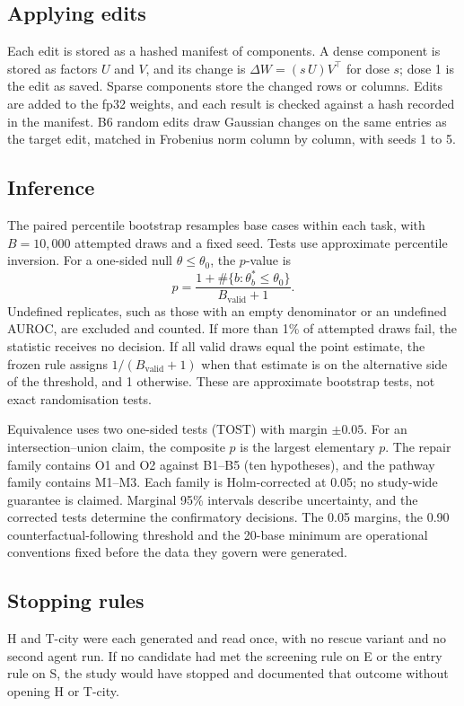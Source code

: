 \subsection{Applying edits}

Each edit is stored as a hashed manifest of components. A dense component is stored as factors $U$ and $V$, and its
change is $\Delta W = (s\,U) V^{\top}$ for dose $s$; dose 1 is the edit as saved. Sparse components store the changed
rows or columns. Edits are added to the fp32 weights, and each result is checked against a hash recorded in the
manifest. B6 random edits draw Gaussian changes on the same entries as the target edit, matched in Frobenius norm
column by column, with seeds 1 to 5.

\subsection{Inference}

The paired percentile bootstrap resamples base cases within each task, with $B = 10{,}000$ attempted draws and a
fixed seed. Tests use approximate percentile inversion. For a one-sided null $\theta \leq \theta_0$, the $p$-value is
\[
  p = \frac{1 + \#\{b : \theta_b^* \leq \theta_0\}}{B_{\mathrm{valid}} + 1}.
\]
Undefined replicates, such as those with an empty denominator or an undefined AUROC, are excluded and counted. If more
than 1\% of attempted draws fail, the statistic receives no decision. If all valid draws equal the point estimate, the
frozen rule assigns $1/(B_{\mathrm{valid}}+1)$ when that estimate is on the alternative side of the threshold, and 1
otherwise. These are approximate bootstrap tests, not exact randomisation tests.

Equivalence uses two one-sided tests (TOST) with margin $\pm 0.05$. For an intersection--union claim, the composite
$p$ is the largest elementary $p$. The repair family contains O1 and O2 against B1--B5 (ten hypotheses), and the
pathway family contains M1--M3. Each family is Holm-corrected at 0.05; no study-wide guarantee is claimed. Marginal
95\% intervals describe uncertainty, and the corrected tests determine the confirmatory decisions. The 0.05 margins,
the 0.90 counterfactual-following threshold and the 20-base minimum are operational conventions fixed
before the data they govern were generated.

\subsection{Stopping rules}

H and T-city were each generated and read once, with no rescue variant and no second agent run. If no candidate had
met the screening rule on E or the entry rule on S, the study would have stopped and documented that outcome without
opening H or T-city.
